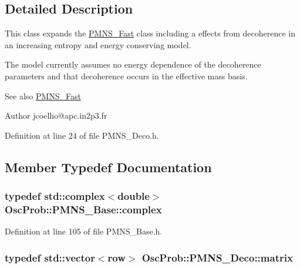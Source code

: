 \subsection{Detailed Description}
This class expands the \hyperlink{classOscProb_1_1PMNS__Fast}{P\+M\+N\+S\+\_\+\+Fast} class including a effects from decoherence in an increasing entropy and energy conserving model.

The model currently assumes no energy dependence of the decoherence parameters and that decoherence occurs in the effective mass basis.

\begin{DoxySeeAlso}{See also}
\hyperlink{classOscProb_1_1PMNS__Fast}{P\+M\+N\+S\+\_\+\+Fast}
\end{DoxySeeAlso}
\begin{DoxyAuthor}{Author}
jcoelho@apc.\+in2p3.\+fr 
\end{DoxyAuthor}


Definition at line 24 of file P\+M\+N\+S\+\_\+\+Deco.\+h.



\subsection{Member Typedef Documentation}
\subsubsection[{\texorpdfstring{complex}{complex}}]{\setlength{\rightskip}{0pt plus 5cm}typedef std\+::complex$<$double$>$ {\bf Osc\+Prob\+::\+P\+M\+N\+S\+\_\+\+Base\+::complex}\hspace{0.3cm}{\ttfamily [inherited]}}\hypertarget{classOscProb_1_1PMNS__Base_ae86ec4718808ce9d02e5f5b4226714ab}{}\label{classOscProb_1_1PMNS__Base_ae86ec4718808ce9d02e5f5b4226714ab}


Definition at line 105 of file P\+M\+N\+S\+\_\+\+Base.\+h.

\subsubsection[{\texorpdfstring{matrix}{matrix}}]{\setlength{\rightskip}{0pt plus 5cm}typedef std\+::vector$<${\bf row}$>$ {\bf Osc\+Prob\+::\+P\+M\+N\+S\+\_\+\+Deco\+::matrix}}\hypertarget{classOscProb_1_1PMNS__Deco_a77b4e0c041b6268910a270be0f5387c9}{}\label{classOscProb_1_1PMNS__Deco_a77b4e0c041b6268910a270be0f5387c9}


